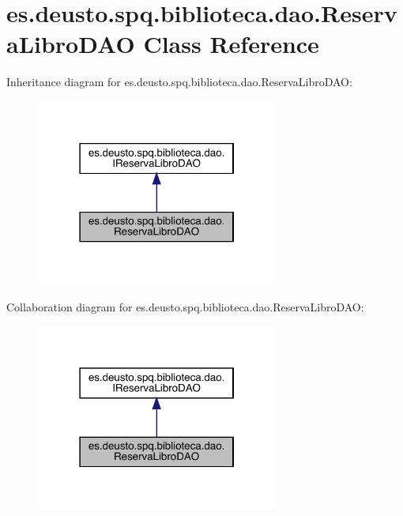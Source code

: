 \hypertarget{classes_1_1deusto_1_1spq_1_1biblioteca_1_1dao_1_1_reserva_libro_d_a_o}{}\section{es.\+deusto.\+spq.\+biblioteca.\+dao.\+Reserva\+Libro\+D\+AO Class Reference}
\label{classes_1_1deusto_1_1spq_1_1biblioteca_1_1dao_1_1_reserva_libro_d_a_o}


Inheritance diagram for es.\+deusto.\+spq.\+biblioteca.\+dao.\+Reserva\+Libro\+D\+AO\+:
\nopagebreak
\begin{figure}[H]
\begin{center}
\leavevmode
\includegraphics[width=226pt]{classes_1_1deusto_1_1spq_1_1biblioteca_1_1dao_1_1_reserva_libro_d_a_o__inherit__graph}
\end{center}
\end{figure}


Collaboration diagram for es.\+deusto.\+spq.\+biblioteca.\+dao.\+Reserva\+Libro\+D\+AO\+:
\nopagebreak
\begin{figure}[H]
\begin{center}
\leavevmode
\includegraphics[width=226pt]{classes_1_1deusto_1_1spq_1_1biblioteca_1_1dao_1_1_reserva_libro_d_a_o__coll__graph}
\end{center}
\end{figure}
